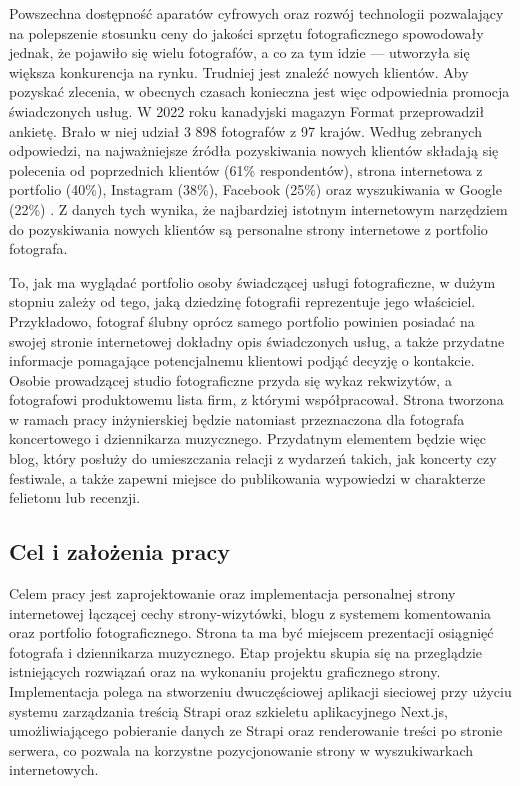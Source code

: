 \documentclass[a4paper, 12pt]{article}
\numberwithin{figure}{section}
\begin{document}
\begin{sloppypar}
Powszechna dostępność aparatów cyfrowych oraz rozwój technologii pozwalający na polepszenie stosunku ceny do jakości sprzętu fotograficznego spowodowały jednak, że pojawiło się wielu fotografów, a co za tym idzie --- utworzyła się większa konkurencja na rynku. Trudniej jest znaleźć nowych klientów. Aby pozyskać zlecenia, w obecnych czasach konieczna jest więc odpowiednia promocja świadczonych usług. W 2022 roku kanadyjski magazyn Format przeprowadził ankietę. Brało w niej udział 3 898 fotografów z 97 krajów. Według zebranych odpowiedzi, na najważniejsze źródła pozyskiwania nowych klientów składają się polecenia od poprzednich klientów (61\% respondentów), strona internetowa z portfolio (40\%), Instagram (38\%), Facebook (25\%) oraz wyszukiwania w Google (22\%) \cite{stateofphotography}. Z danych tych wynika, że najbardziej istotnym internetowym narzędziem do pozyskiwania nowych klientów są personalne strony internetowe z portfolio fotografa.

To, jak ma wyglądać portfolio osoby świadczącej usługi fotograficzne, w dużym stopniu zależy od tego, jaką dziedzinę fotografii reprezentuje jego właściciel. Przykładowo, fotograf ślubny oprócz samego portfolio powinien posiadać na swojej stronie internetowej dokładny opis świadczonych usług, a także przydatne informacje pomagające potencjalnemu klientowi podjąć decyzję o kontakcie. Osobie prowadzącej studio fotograficzne przyda się wykaz rekwizytów, a fotografowi produktowemu lista firm, z którymi współpracował. Strona tworzona w ramach pracy inżynierskiej będzie natomiast przeznaczona dla fotografa koncertowego i dziennikarza muzycznego. Przydatnym elementem będzie więc blog, który posłuży do umieszczania relacji z wydarzeń takich, jak koncerty czy festiwale, a także zapewni miejsce do publikowania wypowiedzi w charakterze felietonu lub recenzji.



\subsection{Cel i założenia pracy}

Celem pracy jest zaprojektowanie oraz implementacja personalnej strony internetowej łączącej cechy strony-wizytówki, blogu z systemem komentowania oraz portfolio fotograficznego. Strona ta ma być miejscem prezentacji osiągnięć fotografa i dziennikarza muzycznego. Etap projektu skupia się na przeglądzie istniejących rozwiązań oraz na wykonaniu projektu graficznego strony. Implementacja polega na stworzeniu dwuczęściowej aplikacji sieciowej przy użyciu systemu zarządzania treścią Strapi oraz szkieletu aplikacyjnego Next.js, umożliwiającego pobieranie danych ze Strapi oraz renderowanie treści po stronie serwera, co pozwala na korzystne pozycjonowanie strony w wyszukiwarkach internetowych. 


\end{sloppypar}
\end{document}

